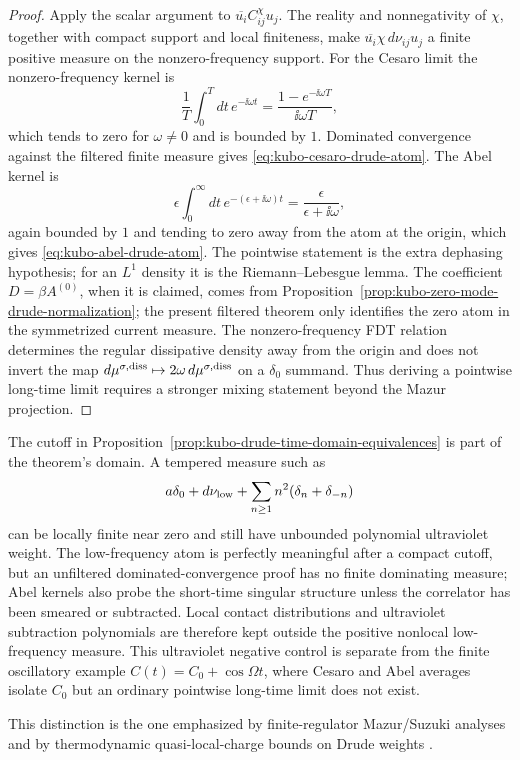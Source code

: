 \begin{proof}
Apply the scalar argument to
\(\overline{u_i}C^\chi_{ij}u_j\).  The reality and nonnegativity of \(\chi\),
together with compact support and local finiteness, make
\(\overline{u_i}\chi\,d\nu_{ij}u_j\) a finite positive measure on the
nonzero-frequency support.  For the Cesaro limit the
nonzero-frequency kernel is
\[
  \frac1T\int_0^Tdt\,e^{-\ii\omega t}
  =
  \frac{1-e^{-\ii\omega T}}{\ii\omega T},
\]
which tends to zero for \(\omega\ne0\) and is bounded by \(1\).  Dominated
convergence against the filtered finite measure gives
\eqref{eq:kubo-cesaro-drude-atom}.  The Abel kernel is
\[
  \epsilon\int_0^\infty dt\,e^{-(\epsilon+\ii\omega)t}
  =
  \frac{\epsilon}{\epsilon+\ii\omega},
\]
again bounded by \(1\) and tending to zero away from the atom at the origin,
which gives \eqref{eq:kubo-abel-drude-atom}.  The pointwise statement is the
extra dephasing hypothesis; for an \(L^1\) density it is the
Riemann--Lebesgue lemma.  The coefficient \(D=\beta A^{(0)}\), when it is
claimed, comes from
Proposition~\ref{prop:kubo-zero-mode-drude-normalization}; the present
filtered theorem only identifies the zero atom in the symmetrized current
measure.  The nonzero-frequency FDT relation determines the regular
dissipative density away from the origin and does not invert the map
\(d\mu^{\sigma,\rm diss}\mapsto 2\omega\,d\mu^{\sigma,\rm diss}\) on a
\(\delta_0\) summand.
Thus deriving a pointwise long-time limit requires a stronger mixing
statement beyond the Mazur projection.
\end{proof}

The cutoff in Proposition~\ref{prop:kubo-drude-time-domain-equivalences} is
part of the theorem's domain.  A tempered measure such as
\[
  a\delta_0+d\nu_{\rm low}+
  \sum_{n\ge1}n^2(\delta_n+\delta_{-n})
\]
can be locally finite near zero and still have unbounded polynomial
ultraviolet weight.  The low-frequency atom is perfectly meaningful after a
compact cutoff, but an unfiltered dominated-convergence proof has no finite
dominating measure; Abel kernels also probe the short-time singular structure
unless the correlator has been smeared or subtracted.  Local contact
distributions and ultraviolet subtraction polynomials are therefore kept
outside the positive nonlocal low-frequency measure.  This ultraviolet
negative control is separate from the finite oscillatory example
\(C(t)=C_0+\cos\Omega t\), where Cesaro and Abel averages isolate \(C_0\)
but an ordinary pointwise long-time limit does not exist.

This distinction is the one emphasized by finite-regulator Mazur/Suzuki
analyses and by thermodynamic quasi-local-charge bounds on Drude weights
\cite{DharKunduSaito2021MazurSuzuki,IlievskiProsen2013DrudeBounds}.

